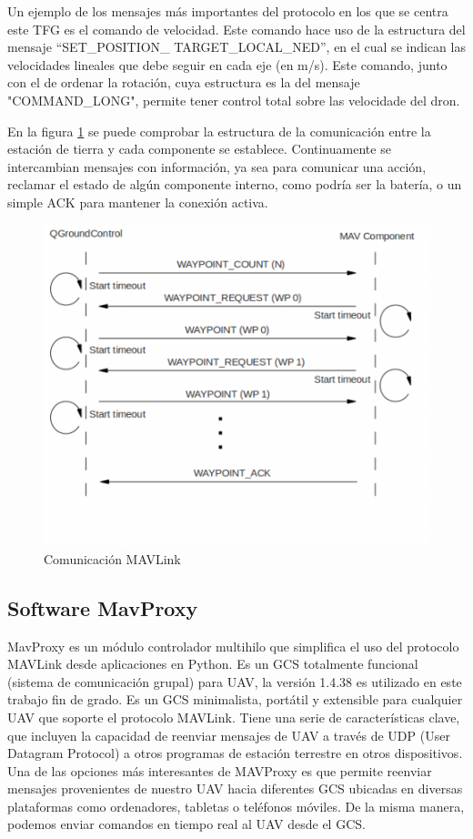 Un ejemplo de los mensajes más importantes del protocolo en los que se centra este TFG es el comando de velocidad. Este comando hace uso de la estructura del mensaje ``SET\_POSITION\_ TARGET\_LOCAL\_NED'', en el cual se indican las velocidades lineales que debe seguir en cada eje (en m/s). Este comando, junto con el de ordenar la rotación, cuya estructura es la del mensaje "COMMAND\_LONG", permite tener control total sobre las velocidade del dron. 

En la figura \ref{fig:comunicacionMAVLink} se puede comprobar la estructura de la comunicación entre la estación de tierra y cada componente se establece. Continuamente se intercambian mensajes con información, ya sea para comunicar una acción, reclamar el estado de algún componente interno, como podría ser la batería, o un simple ACK para mantener la conexión activa.


\begin{figure}[H]
  \centering
  \includegraphics[scale=0.5]{imagenes/comunicacionMavLink.png}
  \caption{Comunicación MAVLink}
  \label{fig:comunicacionMAVLink}
\end{figure}

\subsection{Software MavProxy}
\label{sec:MavProxy}

MavProxy\cite{mavproxy} es un módulo controlador multihilo que simplifica el uso del protocolo MAVLink desde aplicaciones en Python. Es un GCS totalmente funcional (sistema de comunicación grupal) para UAV, la versión 1.4.38 es utilizado en este trabajo fin de grado. Es un GCS minimalista, portátil y extensible para cualquier UAV que soporte el protocolo MAVLink. Tiene una serie de características clave, que incluyen la capacidad de reenviar mensajes de UAV a través de UDP (User Datagram Protocol) a otros programas de estación terrestre en otros dispositivos. Una de las opciones más interesantes de MAVProxy es que permite reenviar mensajes provenientes de nuestro UAV hacia diferentes GCS ubicadas en diversas plataformas como ordenadores, tabletas o teléfonos móviles. De la misma manera, podemos enviar comandos en tiempo real al UAV desde el GCS\cite{danielPlaza}.

